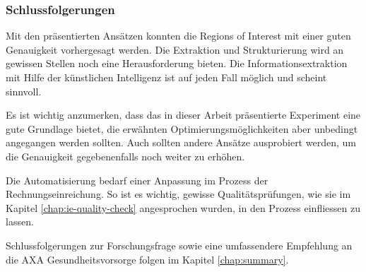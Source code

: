 


\subsubsection{Schlussfolgerungen}

Mit den präsentierten Ansätzen konnten die Regions of Interest mit einer guten Genauigkeit vorhergesagt werden. Die Extraktion und Strukturierung wird an gewissen Stellen noch eine Herausforderung bieten. Die Informationsextraktion mit Hilfe der künstlichen Intelligenz ist auf jeden Fall möglich und scheint sinnvoll.

Es ist wichtig anzumerken, dass das in dieser Arbeit präsentierte Experiment eine gute Grundlage bietet, die erwähnten Optimierungsmöglichkeiten aber unbedingt angegangen werden sollten. Auch sollten andere Ansätze ausprobiert werden, um die Genauigkeit gegebenenfalls noch weiter zu erhöhen.

Die Automatisierung bedarf einer Anpassung im Prozess der Rechnungseinreichung. So ist es wichtig, gewisse Qualitätsprüfungen, wie sie im Kapitel \ref{chap:ie-quality-check} angesprochen wurden, in den Prozess einfliessen zu lassen.

Schlussfolgerungen zur Forschungsfrage sowie eine umfassendere Empfehlung an die AXA Gesundheitsvorsorge folgen im Kapitel \ref{chap:summary}.
